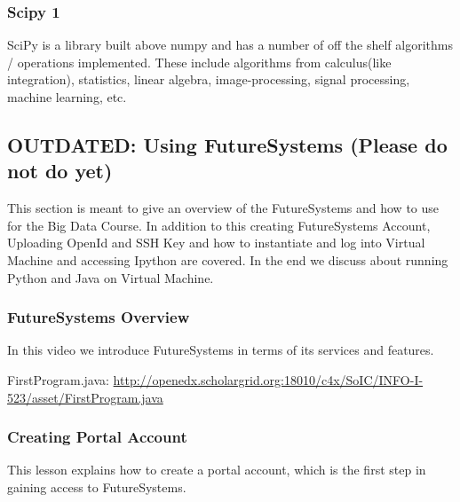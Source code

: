 
\subsubsection{Scipy 1}\label{scipy-1}

SciPy is a library built above numpy and has a number of off the shelf
algorithms / operations implemented. These include algorithms from
calculus(like integration), statistics, linear algebra,
image-processing, signal processing, machine learning, etc.



\subsection{OUTDATED: Using FutureSystems (Please do not do
yet)}\label{outdated-using-futuresystems-please-do-not-do-yet}

This section is meant to give an overview of the FutureSystems and how
to use for the Big Data Course. In addition to this creating
FutureSystems Account, Uploading OpenId and SSH Key and how to
instantiate and log into Virtual Machine and accessing Ipython are
covered. In the end we discuss about running Python and Java on Virtual
Machine.

\subsubsection{FutureSystems Overview}\label{futuresystems-overview}

In this video we introduce FutureSystems in terms of its services and
features.

FirstProgram.java: 
\url{http://openedx.scholargrid.org:18010/c4x/SoIC/INFO-I-523/asset/FirstProgram.java}


\subsubsection{Creating Portal Account}\label{creating-portal-account}

This lesson explains how to create a portal account, which is the first
step in gaining access to FutureSystems.

